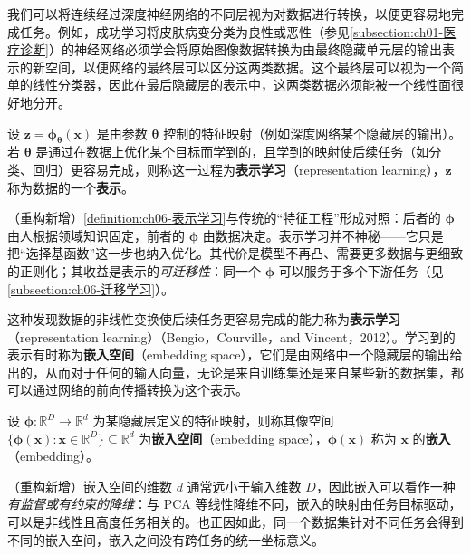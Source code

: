 \documentclass[../../main.tex]{subfiles}
\begin{document}
我们可以将连续经过深度神经网络的不同层视为对数据进行转换，以便更容易地完成任务。例如，成功学习将皮肤病变分类为良性或恶性（参见\cref{subsection:ch01-医疗诊断}）的神经网络必须学会将原始图像数据转换为由最终隐藏单元层的输出表示的新空间，以便网络的最终层可以区分这两类数据。这个最终层可以视为一个简单的线性分类器，因此在最后隐藏层的表示中，这两类数据必须能被一个线性面很好地分开。

\begin{definition}[表示学习]\label{definition:ch06-表示学习}
设 $\boldsymbol{z}=\boldsymbol{\phi}_{\boldsymbol{\theta}}(\boldsymbol{x})$ 是由参数 $\boldsymbol{\theta}$ 控制的特征映射（例如深度网络某个隐藏层的输出）。若 $\boldsymbol{\theta}$ 是通过在数据上优化某个目标而学到的，且学到的映射使后续任务（如分类、回归）更容易完成，则称这一过程为\textbf{表示学习}（representation learning），$\boldsymbol{z}$ 称为数据的一个\textbf{表示}。
\end{definition}

\begin{remark}（重构新增）\cref{definition:ch06-表示学习}与传统的“特征工程”形成对照：后者的 $\boldsymbol{\phi}$ 由人根据领域知识固定，前者的 $\boldsymbol{\phi}$ 由数据决定。表示学习并不神秘——它只是把“选择基函数”这一步也纳入优化。其代价是模型不再凸、需要更多数据与更细致的正则化；其收益是表示的\emph{可迁移性}：同一个 $\boldsymbol{\phi}$ 可以服务于多个下游任务（见\cref{subsection:ch06-迁移学习}）。
\end{remark}

这种发现数据的非线性变换使后续任务更容易完成的能力称为\textbf{表示学习}（representation learning）（Bengio，Courville，and Vincent，2012）。学习到的表示有时称为\textbf{嵌入空间}（embedding space），它们是由网络中一个隐藏层的输出给出的，从而对于任何的输入向量，无论是来自训练集还是来自某些新的数据集，都可以通过网络的前向传播转换为这个表示。

\begin{definition}[嵌入空间]\label{definition:ch06-嵌入空间}
设 $\boldsymbol{\phi}:\mathbb{R}^{D}\to\mathbb{R}^{d}$ 为某隐藏层定义的特征映射，则称其像空间 $\{\boldsymbol{\phi}(\boldsymbol{x}):\boldsymbol{x}\in\mathbb{R}^{D}\}\subseteq\mathbb{R}^{d}$ 为\textbf{嵌入空间}（embedding space），$\boldsymbol{\phi}(\boldsymbol{x})$ 称为 $\boldsymbol{x}$ 的\textbf{嵌入}（embedding）。
\end{definition}

\begin{remark}（重构新增）嵌入空间的维数 $d$ 通常远小于输入维数 $D$，因此嵌入可以看作一种\emph{有监督或有约束的降维}：与 PCA 等线性降维不同，嵌入的映射由任务目标驱动，可以是非线性且高度任务相关的。也正因如此，同一个数据集针对不同任务会得到不同的嵌入空间，嵌入之间没有跨任务的统一坐标意义。
\end{remark}
\end{document}
